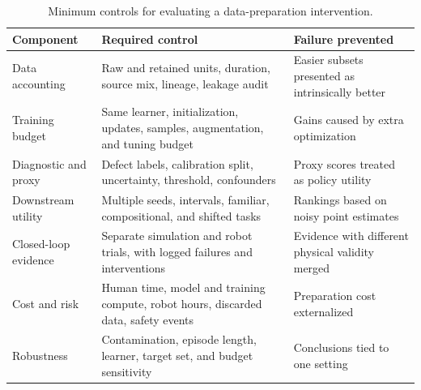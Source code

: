 \begin{table}[t]
\centering
\caption{Minimum controls for evaluating a data-preparation intervention.}
\label{tab:evaluation-protocol}
\small
\setlength{\tabcolsep}{5pt}
\renewcommand{\arraystretch}{1.08}
\begin{tabularx}{\textwidth}{@{}p{2.6cm}X X@{}}
\toprule
Component & Required control & Failure prevented \\
\midrule
Data accounting & Raw and retained units, duration, source mix, lineage, leakage audit & Easier subsets presented as intrinsically better \\
Training budget & Same learner, initialization, updates, samples, augmentation, and tuning budget & Gains caused by extra optimization \\
Diagnostic and proxy & Defect labels, calibration split, uncertainty, threshold, confounders & Proxy scores treated as policy utility \\
Downstream utility & Multiple seeds, intervals, familiar, compositional, and shifted tasks & Rankings based on noisy point estimates \\
Closed-loop evidence & Separate simulation and robot trials, with logged failures and interventions & Evidence with different physical validity merged \\
Cost and risk & Human time, model and training compute, robot hours, discarded data, safety events & Preparation cost externalized \\
Robustness & Contamination, episode length, learner, target set, and budget sensitivity & Conclusions tied to one setting \\
\bottomrule
\end{tabularx}
\end{table}
